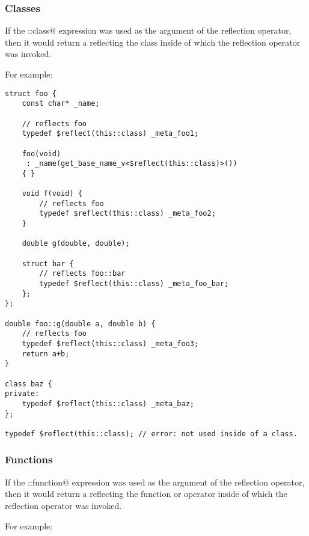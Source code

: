 \subsubsection{Classes}

If the \verb@this::class@ expression was used as the argument of the reflection
operator, then it would return a  reflecting the class
inside of which the reflection operator was invoked.

For example:

\begin{verbatim}
struct foo {
	const char* _name;

	// reflects foo
	typedef $reflect(this::class) _meta_foo1;

	foo(void)
	 : _name(get_base_name_v<$reflect(this::class)>())
	{ }

	void f(void) {
		// reflects foo
		typedef $reflect(this::class) _meta_foo2;
	}

	double g(double, double);

	struct bar {
		// reflects foo::bar
		typedef $reflect(this::class) _meta_foo_bar;
	};
};

double foo::g(double a, double b) {
	// reflects foo
	typedef $reflect(this::class) _meta_foo3;
	return a+b;
}

class baz {
private:
	typedef $reflect(this::class) _meta_baz;
};

typedef $reflect(this::class); // error: not used inside of a class.

\end{verbatim}

\subsubsection{Functions}

If the \verb@this::function@ expression was used as the argument of the reflection
operator, then it would return a  reflecting the function or operator
inside of which the reflection operator was invoked.

For example:

